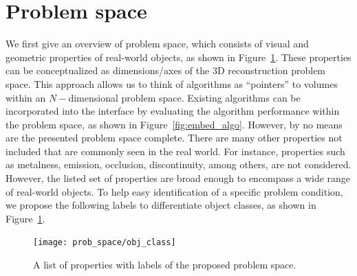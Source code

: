 \section{Problem space}
\label{sec:prob_space}
We first give an overview of problem space, which consists of visual and geometric properties of real-world objects, as shown in Figure~\ref{fig:obj_class}. These properties can be conceptualized as dimensions/axes of the 3D reconstruction problem space. This approach allows us to think of algorithms as ``pointers'' to volumes within an $N-$dimensional problem space. Existing algorithms can be incorporated into the interface by evaluating the algorithm performance within the problem space, as shown in Figure~\ref{fig:embed_algo}. However, by no means are the presented problem space complete. There are many other properties not included that are commonly seen in the real world. For instance, properties such as metalness, emission, occlusion, discontinuity, among others, are not considered. However, the listed set of properties are broad enough to encompass a wide range of real-world objects. To help easy identification of a specific problem condition, we propose the following labels to differentiate object classes, as shown in Figure~\ref{fig:obj_class}.
\begin{figure}[!htbp]
\centering
\texttt{[image: prob\_space/obj\_class]}\\
\caption{A list of properties with labels of the proposed problem space.}
\label{fig:obj_class}
\end{figure}

